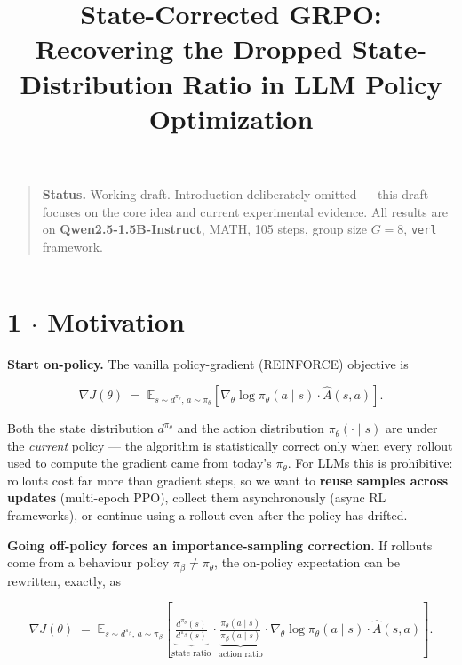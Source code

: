 \documentclass[11pt,a4paper]{article}
\title{State-Corrected GRPO: Recovering the Dropped State-Distribution Ratio in LLM Policy Optimization}
\makeatletter
\theoremstyle{remark}
\renewcommand{\maketitle}{%
  \begin{center}
    {\LARGE\bfseries \@title\par}\vspace{0.6em}
  \end{center}\vspace{0.5em}}
\makeatother
\begin{document}
\maketitle
\begin{quote}
\textbf{Status.} Working draft. Introduction deliberately omitted --- this draft focuses on the core idea and current experimental evidence. All results are on \textbf{Qwen2.5-1.5B-Instruct}, MATH, 105 steps, group size $G=8$, \texttt{verl} framework.

\end{quote}
\vspace{0.5em}\hrule\vspace{0.5em}
\section*{1 $\cdot$ Motivation}

\textbf{Start on-policy.} The vanilla policy-gradient (REINFORCE) objective is


\begin{equation*}
\nabla J(\theta) \;=\; \mathbb E_{s\sim d^{\pi_\theta},\,a\sim \pi_\theta}\!\left[\nabla_\theta\log\pi_\theta(a\mid s)\cdot \hat A(s,a)\right].
\end{equation*}


Both the state distribution $d^{\pi_\theta}$ and the action distribution $\pi_\theta(\cdot\mid s)$ are under the \emph{current} policy --- the algorithm is statistically correct only when every rollout used to compute the gradient came from today's $\pi_\theta$. For LLMs this is prohibitive: rollouts cost far more than gradient steps, so we want to \textbf{reuse samples across updates} (multi-epoch PPO), collect them asynchronously (async RL frameworks), or continue using a rollout even after the policy has drifted.

\textbf{Going off-policy forces an importance-sampling correction.} If rollouts come from a behaviour policy $\pi_\beta\neq\pi_\theta$, the on-policy expectation can be rewritten, exactly, as


\begin{equation*}
\nabla J(\theta) \;=\; \mathbb E_{s\sim d^{\pi_\beta},\,a\sim \pi_\beta}\!\left[\underbrace{\tfrac{d^{\pi_\theta}(s)}{d^{\pi_\beta}(s)}}_{\text{state ratio}}\cdot \underbrace{\tfrac{\pi_\theta(a\mid s)}{\pi_\beta(a\mid s)}}_{\text{action ratio}}\cdot \nabla_\theta\log\pi_\theta(a\mid s)\cdot \hat A(s,a)\right].
\end{equation*}
\end{document}

